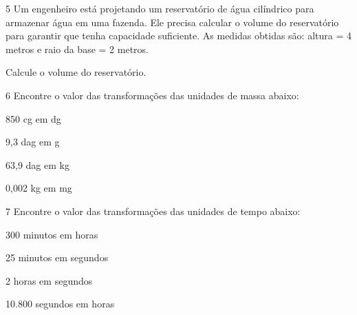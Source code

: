 
\num{5} Um engenheiro está projetando um reservatório de água cilíndrico para
armazenar água em uma fazenda. Ele precisa calcular o volume do
reservatório para garantir que tenha capacidade suficiente. As medidas
obtidas são: altura = 4 metros e raio da base = 2 metros.

Calcule o volume do reservatório.


\num{6} Encontre o valor das transformações das unidades de massa abaixo:


\begin{escolha}[itemsep=0pt]
\item 850 cg em dg
 \\ 

\item 9,3 dag em g
 \\ 

\item 63,9 dag em kg
 \\ 

\item 0,002 kg em mg
 \\ 
\end{escolha}

\num{7} Encontre o valor das transformações das unidades de tempo abaixo:

\begin{escolha}[itemsep=0pt]
\item 300 minutos em horas
 \\

\item 25 minutos em segundos
 \\

\item 2 horas em segundos
 \\

\item 10.800 segundos em horas
 \\
\end{escolha}

